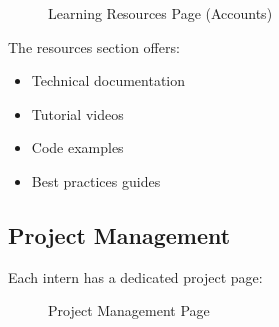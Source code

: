 \begin{figure}[H]
    \centering
    \caption{Learning Resources Page (Accounts)}
    \label{fig:resources}
\end{figure}

The resources section offers:
\begin{itemize}
    \item Technical documentation
    \item Tutorial videos
    \item Code examples
    \item Best practices guides
\end{itemize}

\subsection{Project Management}
\noindent
Each intern has a dedicated project page:

\begin{figure}[H]
    \centering
    \caption{Project Management Page}
    \label{fig:project}
\end{figure}

